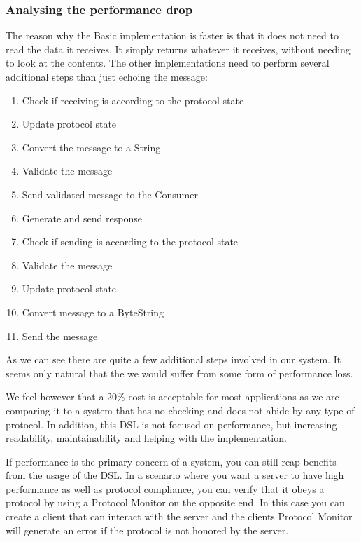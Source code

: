 \subsubsection{Analysing the performance drop}
The reason why the Basic implementation is faster is that it does not need to read the data it receives. It simply returns whatever it receives, without needing to look at the contents. The other implementations need to perform several additional steps than just echoing the message:
\begin{enumerate}
  \item Check if receiving is according to the protocol state
  \item Update protocol state
  \item Convert the message to a String 
  \item Validate the message
  \item Send validated message to the Consumer
  \item Generate and send response
  \item Check if sending is according to the protocol state
  \item Validate the message
  \item Update protocol state
  \item Convert message to a ByteString
  \item Send the message
\end{enumerate}
As we can see there are quite a few additional steps involved in our system. It seems only natural that the we would suffer from some form of performance loss.

We feel however that a 20\% cost is acceptable for most applications as we are comparing it to a system that has no checking and does not abide by any type of protocol. In addition, this DSL is not focused on performance, but increasing readability, maintainability and helping with the implementation.

If performance is the primary concern of a system, you can still reap benefits from the usage of the DSL. In a scenario where you want a server to have high performance as well as protocol compliance, you can verify that it obeys a protocol by using a Protocol Monitor on the opposite end. In this case you can create a client that can interact with the server and the clients Protocol Monitor will generate an error if the protocol is not honored by the server.  


